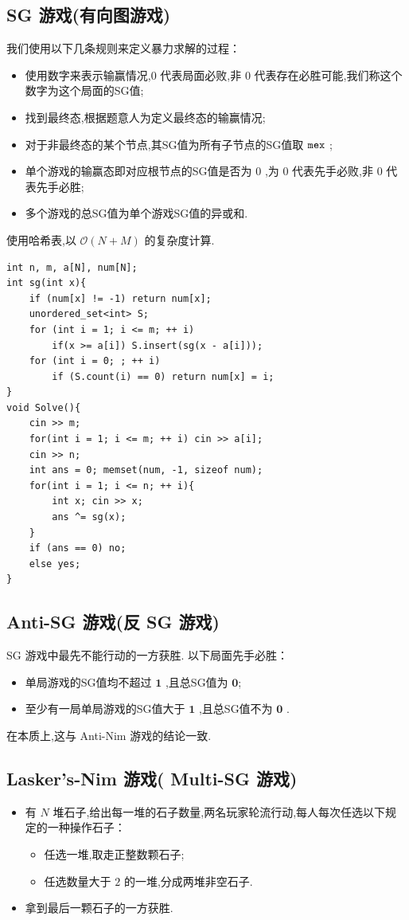 \subsection{SG 游戏(有向图游戏)}
我们使用以下几条规则来定义暴力求解的过程：
\begin{itemize}
    \item 使用数字来表示输赢情况,$0$ 代表局面必败,非 $0$ 代表存在必胜可能,我们称这个数字为这个局面的SG值;
    \item 找到最终态,根据题意人为定义最终态的输赢情况;
    \item 对于非最终态的某个节点,其SG值为所有子节点的SG值取 $\tt{}mex$ ;
    \item 单个游戏的输赢态即对应根节点的SG值是否为 $0$ ,为 $0$ 代表先手必败,非 $0$ 代表先手必胜;
    \item 多个游戏的总SG值为单个游戏SG值的异或和.
\end{itemize}
使用哈希表,以 $\mathcal{O} (N + M)$ 的复杂度计算.
\begin{lstlisting}[caption={}]
int n, m, a[N], num[N];
int sg(int x){
    if (num[x] != -1) return num[x];
    unordered_set<int> S;
    for (int i = 1; i <= m; ++ i) 
        if(x >= a[i]) S.insert(sg(x - a[i]));
    for (int i = 0; ; ++ i)
        if (S.count(i) == 0) return num[x] = i;
}
void Solve(){
    cin >> m;
    for(int i = 1; i <= m; ++ i) cin >> a[i];
    cin >> n;
    int ans = 0; memset(num, -1, sizeof num);
    for(int i = 1; i <= n; ++ i){
        int x; cin >> x;
        ans ^= sg(x);
    }
    if (ans == 0) no;
    else yes;
}
\end{lstlisting}



\subsection{Anti-SG 游戏(反 SG 游戏)}
SG 游戏中最先不能行动的一方获胜.
以下局面先手必胜：

\begin{itemize}
    \item 单局游戏的SG值均不超过 $\pmb 1$ ,且总SG值为 $\pmb 0$;
    \item 至少有一局单局游戏的SG值大于 $\pmb 1$ ,且总SG值不为 $\pmb 0$ .
\end{itemize}

在本质上,这与 Anti-Nim 游戏的结论一致.




\subsection{Lasker’s-Nim 游戏( Multi-SG 游戏)}
\begin{itemize}
\item 有 $N$ 堆石子,给出每一堆的石子数量,两名玩家轮流行动,每人每次任选以下规定的一种操作石子：
\begin{itemize}
\item 任选一堆,取走正整数颗石子;
\item 任选数量大于 $2$ 的一堆,分成两堆非空石子.
\end{itemize}
\item 拿到最后一颗石子的一方获胜.
\end{itemize}

